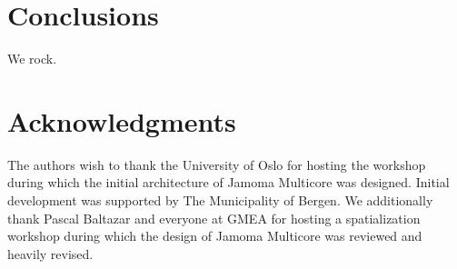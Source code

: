 \documentclass[twoside,a4paper]{article}
\begin{document}


\section{Conclusions}
We rock.

%
%
%
%




\section{Acknowledgments}

The authors wish to thank the University of Oslo for hosting the workshop during which the initial architecture of Jamoma Multicore was designed. Initial development was supported by The Municipality of Bergen.  We additionally thank Pascal Baltazar and everyone at GMEA for hosting a spatialization workshop during which the design of Jamoma Multicore was reviewed and heavily revised.




\end{document}
